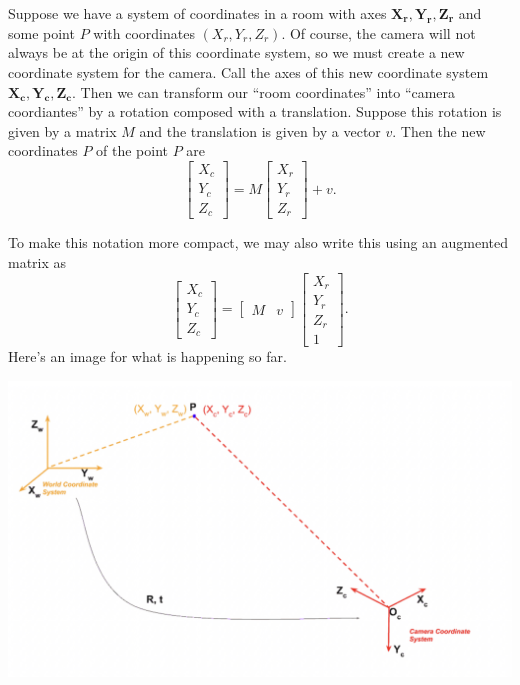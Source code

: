 \documentclass{article}
\begin{document}
Suppose we have a system of coordinates in a room with axes $\mathbf{X_r,Y_r,Z_r}$ and some point $P$ with coordinates $(X_r, Y_r, Z_r)$. Of course, the camera will not always be at the origin of this coordinate system, so we must create a new coordinate system for the camera. Call the axes of this new coordinate system $\mathbf{X_c,Y_c,Z_c}$. 
Then we can transform our ``room coordinates'' into ``camera coordiantes'' by a rotation composed with a translation. Suppose this rotation is given by a matrix $M$ and the translation is given by a vector $v$. Then the new coordinates $P$ of the point $P$ are 
\[
\begin{bmatrix}
    X_c \\
    Y_c \\
    Z_c
\end{bmatrix} = M \begin{bmatrix}
    X_r \\
    Y_r \\
    Z_r
\end{bmatrix} + v
.\]

To make this notation more compact, we may also write this using an augmented matrix as
\[
\begin{bmatrix}
    X_c \\
    Y_c \\
    Z_c
\end{bmatrix} = \begin{bmatrix}
    M & v
\end{bmatrix}
\begin{bmatrix}
    X_r \\
    Y_r \\
    Z_r \\
    1
\end{bmatrix}
.\] Here's an image for what is happening so far. 

\begin{center}
\includegraphics[scale=0.3]{IMG_1112.jpeg}
\end{center}
\end{document}
